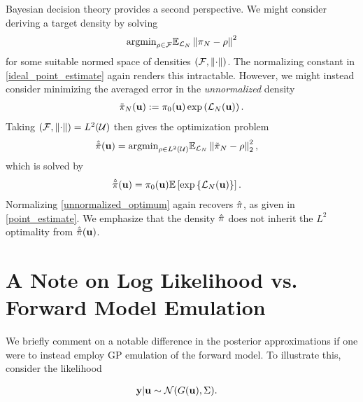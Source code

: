\documentclass[12pt]{article}
\begin{document}
Bayesian decision theory provides a second perspective. We might consider deriving a target density by solving 
\begin{align}
\text{argmin}_{\rho \in \mathcal{F}} \mathbb{E}_{\mathcal{L}_{N}} \left\lVert\pi_{N} - \rho\right\rVert^2
\end{align}  
for some suitable normed space of densities $(\mathcal{F}, \left\lVert\cdot\right\rVert)$. The normalizing constant in \ref{ideal_point_estimate} again renders 
this intractable. However, we might instead consider minimizing the averaged error in the \textit{unnormalized} density 
\begin{align}
\tilde{\pi}_{N}(\mathbf{u}) := \pi_0(\mathbf{u}) \exp\left(\mathcal{L}_{N}(\mathbf{u})\right). 
\end{align}
Taking $(\mathcal{F}, \left\lVert\cdot\right\rVert) = L^2(\mathcal{U})$ then gives the optimization problem 
\begin{align}
\hat{\tilde{\pi}}(\mathbf{u}) &= \text{argmin}_{\rho \in L^2(\mathcal{U})} \mathbb{E}_{\mathcal{L}_{N}} \left\lVert\tilde{\pi}_{N} - \rho\right\rVert_2^2,
\end{align} 
which is solved by 
\begin{align}
\hat{\tilde{\pi}}(\mathbf{u}) &= \pi_0(\mathbf{u}) \mathbb{E}\left[\exp\left\{\mathcal{L}_{N}(\mathbf{u})\right\} \right]. \label{unnormalized_optimum}
\end{align}
Normalizing \ref{unnormalized_optimum} again recovers $\hat{\pi}$, as given in \ref{point_estimate}. We emphasize that the density 
$\hat{\pi}$ does not inherit the $L^2$ optimality from $\hat{\tilde{\pi}}(\mathbf{u})$. 

\section{A Note on Log Likelihood vs. Forward Model Emulation}
We briefly comment on a notable difference in the posterior approximations if one were to instead employ GP emulation of the forward model. 
To illustrate this, consider the likelihood  

\begin{align*}
\mathbf{y}|\mathbf{u} &\sim \mathcal{N}(G(\mathbf{u}), \Sigma). 
\end{align*}
\end{document}
